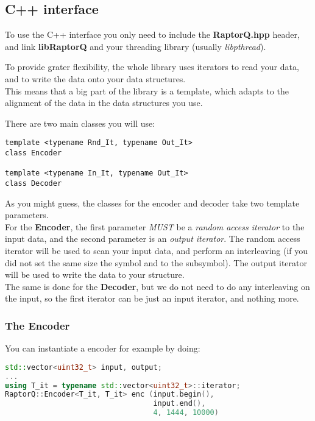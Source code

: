 \documentclass[11pt,a4paper]{refart}
\begin{document}
\subsection{C++ interface}
To use the C++ interface you only need to include the \textbf{RaptorQ.hpp} header, and link \textbf{libRaptorQ} and your threading library (usually
\textit{libpthread}).

To provide grater flexibility, the whole library uses iterators to read your data, and to write the data onto your data structures.\\
This means that a big part of the library is a template, which adapts to the alignment of the data in the data structures you use.

There are two main classes you will use:
\begin{verbatim}
template <typename Rnd_It, typename Out_It>
class Encoder

template <typename In_It, typename Out_It>
class Decoder
\end{verbatim}

As you might guess, the classes for the encoder and decoder take two template parameters.\\
For the \textbf{Encoder}, the first parameter \textit{MUST} be a \textit{random access iterator} to the input data, and the second parameter is an
\textit{output iterator}. The random access iterator will be used to scan your input data, and perform an interleaving (if you did not set the same size the
symbol and to the subsymbol). The output iterator will be used to write the data to your structure.\\
The same is done for the \textbf{Decoder}, but we do not need to do any interleaving on the input, so the first iterator can be just an input iterator,
and nothing more.


\subsubsection{The Encoder}
You can instantiate a encoder for example by doing:

\begin{lstlisting}[language=C++]
std::vector<uint32_t> input, output;
...
using T_it = typename std::vector<uint32_t>::iterator;
RaptorQ::Encoder<T_it, T_it> enc (input.begin(),
                                  input.end(),
                                  4, 1444, 10000)
\end{lstlisting}
\end{document}
